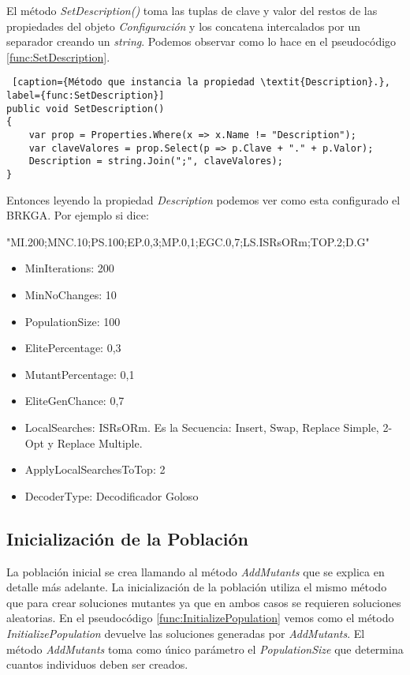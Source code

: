 \bigskip

El método \textit{SetDescription()} toma las tuplas de clave y valor del restos de las propiedades del objeto \textit{Configuración} y los concatena intercalados por un separador creando un \textit{string}. Podemos observar como lo hace en el pseudocódigo \ref{func:SetDescription}.

\bigskip

\begin{minipage}{\linewidth}
\begin{lstlisting} [caption={Método que instancia la propiedad \textit{Description}.}, label={func:SetDescription}]
public void SetDescription()
{ 
	var prop = Properties.Where(x => x.Name != "Description");
	var claveValores = prop.Select(p => p.Clave + "." + p.Valor);
	Description = string.Join(";", claveValores);
}
\end{lstlisting}
\end{minipage}

\bigskip

\begin{minipage}{\textwidth}
Entonces leyendo la propiedad \textit{Description} podemos ver como esta configurado el BRKGA. Por ejemplo si dice: 

\bigskip"MI.200;MNC.10;PS.100;EP.0,3;MP.0,1;EGC.0,7;LS.ISRsORm;TOP.2;D.G"

\begin{itemize}
  \item MinIterations: 200
  \item MinNoChanges: 10
  \item PopulationSize: 100
  \item ElitePercentage: 0,3
  \item MutantPercentage: 0,1
  \item EliteGenChance: 0,7
  \item LocalSearches: ISRsORm. Es la Secuencia: Insert, Swap, Replace Simple, 2-Opt y Replace Multiple.
  \item ApplyLocalSearchesToTop: 2
  \item DecoderType: Decodificador Goloso
\end{itemize}
\end{minipage}

\subsection{Inicialización de la Población}\label{subsec:InitializePopulation}

La población inicial se crea llamando al método \textit{AddMutants} que se explica en detalle más adelante. La inicialización de la población utiliza el mismo método que para crear soluciones mutantes ya que en ambos casos se requieren soluciones aleatorias. En el pseudocódigo \ref{func:InitializePopulation} vemos como el método \textit{InitializePopulation} devuelve las soluciones generadas por \textit{AddMutants}. El método \textit{AddMutants} toma como único parámetro el \textit{PopulationSize} que determina cuantos individuos deben ser creados.

